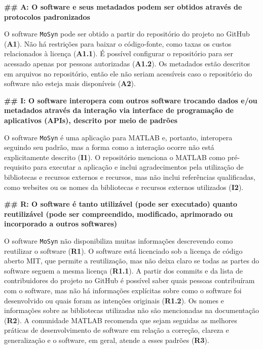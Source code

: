 \noindent \textbf{\#\# A: O software e seus metadados podem ser obtidos através de protocolos padronizados}

O software \texttt{MoSyn} pode ser obtido a partir do repositório do projeto no GitHub (\textbf{A1}). Não há restrições para baixar o código-fonte, como taxas os custos relacionados à licença (\textbf{A1.1}). É possível configurar o repositório para ser acessado apenas por pessoas autorizadas (\textbf{A1.2}). Os metadados estão descritos em arquivos no repositório, então ele não seriam acessíveis caso o repositório do software não esteja mais disponíveis (\textbf{A2}).

\noindent \textbf{\#\# I: O software interopera com outros software trocando dados e/ou metadados através da interação via interface de programação de aplicativos (APIs), descrito por meio de padrões}

O software \texttt{MoSyn} é uma aplicação para MATLAB e, portanto, interopera seguindo seu padrão, mas a forma como a interação ocorre não está explicitamente descrito (\textbf{I1}). O repositório menciona o MATLAB como pré-requisito para executar a aplicação e inclui agradecimentos pela utilização de bibliotecas e recursos externos e recursos, mas não inclui referências qualificadas, como websites ou os nomes da bibliotecas e recursos externos utilizados (\textbf{I2}). 

\noindent \textbf{\#\# R: O software é tanto utilizável (pode ser executado) quanto reutilizável (pode ser compreendido, modificado, aprimorado ou incorporado a outros softwares)}

O software \texttt{MoSyn} não disponibiliza muitas informações descrevendo como reutilizar o software (\textbf{R1}). O software  está licenciado sob a licença de código aberto MIT, que permite a reutilização, mas não deixa claro se todas as partes do software seguem a mesma licença (\textbf{R1.1}). A partir dos commits e da lista de contribuidores do projeto no GitHub é possível saber quais pessoas contribuíram com o software, mas não há informações explícitas sobre como o software foi desenvolvido ou quais foram as intenções originais (\textbf{R1.2}). Os nomes e informações sobre as bibliotecas utilizadas não são mencionadas na documentação (\textbf{R2}). A comunidade MATLAB recomenda que sejam seguidas as melhores práticas de desenvolvimento de software em relação a correção, clareza e generalização e o software, em geral, atende a esses padrões (\textbf{R3}).



